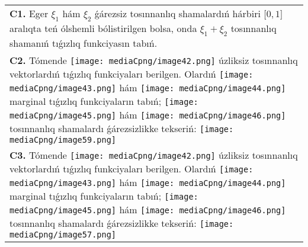 \documentclass{article}
\begin{document}
\begin{tabular}{m{17cm}}
 \\
\textbf{C1.} Eger \(\xi_{1}\) hám \(\xi_{2}\) ǵárezsiz tosınnanlıq shamalardıń hárbiri \(\lbrack 0,1\rbrack\) aralıqta teń ólshemli bólistirilgen bolsa, onda \(\xi_{1} + \xi_{2}\) tosınnanlıq shamanıń tıǵızlıq funkciyasın tabıń.
 \\
\textbf{C2.} Tómende \texttt{[image: mediaCpng/image42.png]} úzliksiz tosınnanlıq vektorlardıń tıǵızlıq funkciyaları berilgen. Olardıń \texttt{[image: mediaCpng/image43.png]} hám \texttt{[image: mediaCpng/image44.png]} marginal tıǵızlıq funkciyaların tabıń; \texttt{[image: mediaCpng/image45.png]} hám \texttt{[image: mediaCpng/image46.png]} tosınnanlıq shamalardı ǵárezsizlikke tekseriń: \texttt{[image: mediaCpng/image59.png]}
 \\
\textbf{C3.} Tómende \texttt{[image: mediaCpng/image42.png]} úzliksiz tosınnanlıq vektorlardıń tıǵızlıq funkciyaları berilgen. Olardıń \texttt{[image: mediaCpng/image43.png]} hám \texttt{[image: mediaCpng/image44.png]} marginal tıǵızlıq funkciyaların tabıń; \texttt{[image: mediaCpng/image45.png]} hám \texttt{[image: mediaCpng/image46.png]} tosınnanlıq shamalardı ǵárezsizlikke tekseriń: \texttt{[image: mediaCpng/image57.png]}
 \\

\end{tabular}
\vspace{1cm}
\end{document}
